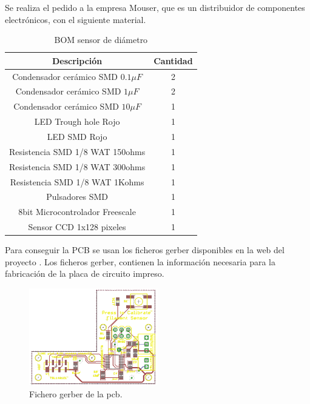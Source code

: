 Se realiza el pedido a la empresa Mouser, que es un distribuidor de componentes electrónicos, con el siguiente material.

\begin{table}[H]
\centering
\begin{tabular}{cc}
{\bf Descripción}                 & {\bf Cantidad} \\ \hline
Condensador cerámico SMD $0.1 \mu F$ & 2              \\
Condensador cerámico SMD $1 \mu F$   & 2              \\
Condensador cerámico SMD $10 \mu F$  & 1              \\
LED Trough hole Rojo             & 1              \\
LED SMD Rojo                     & 1              \\
Resistencia SMD 1/8 WAT 150ohms  & 1              \\
Resistencia SMD 1/8 WAT 300ohms  & 1              \\
Resistencia SMD 1/8 WAT 1Kohms   & 1              \\
Pulsadores SMD                   & 1              \\
8bit Microcontrolador Freescale  & 1              \\
Sensor CCD 1x128 pixeles         & 1             
\end{tabular}
\caption{BOM sensor de diámetro}
\label{tab:BOM}
\end{table}

Para conseguir la PCB se usan los ficheros gerber disponibles en la web del proyecto \cite{thing_filamento}. Los ficheros gerber, contienen la información necesaria para la fabricación de la placa de circuito impreso.

   \begin{figure}[H]
            \centering
            \includegraphics[width=0.5\textwidth]{images/sensor/gerber.png}
            \caption{Fichero gerber de la pcb.}
            \label{fig:sens_gerber}
    \end{figure}

